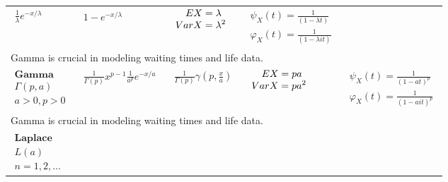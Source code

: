 \documentclass{article}
\begin{document}
\begin{landscape}
\begin{table}[ht]
\begin{tabular}{@{}l p{6.0cm} p{5cm} p{3.0cm} r@{}}
$\begin{array}{l}
\displaystyle   \frac{1}{\lambda} e^{-x / \lambda} \\
\end{array}$ & 
$\begin{array}{l}
    \displaystyle  1-e^{-x / \lambda}
\end{array}$ & 
$\begin{array}{l}
\displaystyle \hspace{0.36cm} EX = \lambda \\
\displaystyle VarX = \lambda^2
\end{array}$ & 
$\begin{array}{r}
\displaystyle \psi_X(t) = \frac{1}{(1 - \lambda t)} \\
\displaystyle \varphi_X(t) = \frac{1}{(1 - \lambda it)}
\end{array}$ \\
\multicolumn{4}{p{19cm}}{Gamma is crucial in modeling waiting times and life data.} \\



$\begin{array}{l}
    \textbf{Gamma} \\
    \Gamma(p, a) \\
    a > 0, p > 0
\end{array}$ & 

$\begin{array}{l}
\displaystyle  \frac{1}{\Gamma(p)} x^{p-1} \frac{1}{a^p} e^{-x/a} \\
\end{array}$ & 
$\begin{array}{l}
    \displaystyle  \frac{1}{\Gamma(p)} \gamma \left(p, \frac{x}{a}\right)
\end{array}$ & 
$\begin{array}{l}
\displaystyle \hspace{0.36cm} EX = pa \\
\displaystyle VarX = pa^2
\end{array}$ & 
$\begin{array}{r}
\displaystyle \psi_X(t) = \frac{1}{(1 - a t)^{p}} \\
\displaystyle \varphi_X(t) = \frac{1}{(1 - a it)^{p}}
\end{array}$ \\
\multicolumn{4}{p{19cm}}{Gamma is crucial in modeling waiting times and life data.} \\

$\begin{array}{l}
    \textbf{Laplace} \\
    L(a) \\
    n = 1, 2,...
\end{array}$ & 


\end{tabular}
\end{table}
\end{landscape}
\end{document}
